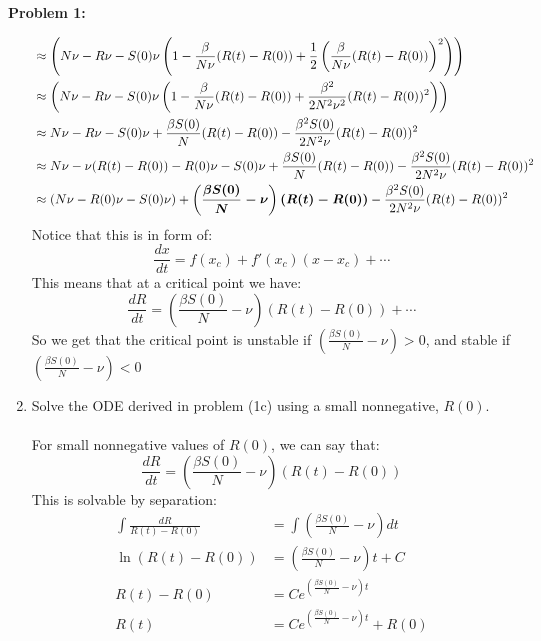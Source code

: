 \documentclass[11pt]{article}
\newcommand{\bmathIT}[1]{\text{\boldmath#1\unboldmath}}
\newenvironment{problem}[1]{\textbf{Problem #1: }}{\newpage}
\begin{document}
\begin{problem}{1}
\begin{enumerate}[label = (\alph*)]
\begin{align*}
			&\approx \left(N\nu - R\nu - S(0)\nu \left( 1 - \frac{\beta}{N \nu}(R(t) - R(0)) + \frac{1}{2}\left(\frac{\beta}{N \nu}(R(t) - R(0))\right)^2\right) \right) \\
			&\approx \left(N\nu - R\nu - S(0)\nu \left( 1 - \frac{\beta}{N \nu}(R(t) - R(0)) + \frac{\beta^2}{2 N^2 \nu^2}(R(t) - R(0))^2 \right) \right) \\
			&\approx N\nu - R\nu - S(0)\nu + \frac{\beta S(0)}{N}(R(t) - R(0)) - \frac{\beta^2 S(0)}{2 N^2 \nu}(R(t) - R(0))^2 \\
			&\approx N\nu - \nu(R(t) - R(0)) - R(0)\nu - S(0)\nu + \frac{\beta S(0)}{N}(R(t) - R(0)) - \frac{\beta^2 S(0)}{2 N^2 \nu}(R(t) - R(0))^2 \\
			&\approx \left(N\nu - R(0)\nu - S(0)\nu\right) + \bmathIT{$\left(\frac{\beta S(0)}{N}-\nu\right)(R(t) - R(0))$} - \frac{\beta^2 S(0)}{2 N^2 \nu}(R(t) - R(0))^2 
			\end{align*}
			Notice that this is in form of:
			\[\frac{dx}{dt} = f(x_c) + f'(x_c)(x-x_c) + \cdots \]
			This means that at a critical point we have:
			\[\frac{dR}{dt} = \left(\frac{\beta S(0)}{N}-\nu\right)(R(t) - R(0)) + \cdots \]
			So we get that the critical point is unstable if $\left(\frac{\beta S(0)}{N}-\nu\right) > 0$, and stable if $\left(\frac{\beta S(0)}{N}-\nu\right) < 0$
			\newpage
			\item  Solve the ODE derived in problem (1c) using a small nonnegative, $R(0)$.
			\\ \\
			For small nonnegative values of $R(0)$, we can say that:
			\[\frac{dR}{dt} = \left(\frac{\beta S(0)}{N}-\nu\right)(R(t) - R(0))\]
			This is solvable by separation:
			\begin{align*}
				\int \frac{dR}{R(t) - R(0)} &= \int \left(\frac{\beta S(0)}{N}-\nu\right) dt \\
				\ln (R(t) - R(0) ) &= \left(\frac{\beta S(0)}{N}-\nu\right) t + C \\
				R(t) - R(0) &= Ce^{\left(\frac{\beta S(0)}{N}-\nu\right) t} \\
				R(t) &= Ce^{\left(\frac{\beta S(0)}{N}-\nu\right) t} + R(0)
			\end{align*}
		\end{enumerate}
	\end{problem}
\end{document}
